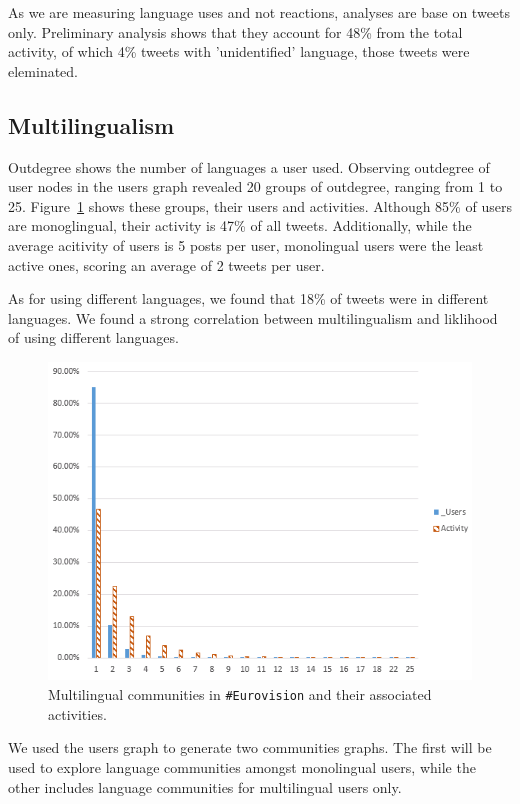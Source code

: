 \documentclass{llncs}
\begin{document}

As we are measuring language uses and not reactions, analyses are
base on tweets only. Preliminary analysis shows that they account 
for 48\% from the total activity, of which 4\% tweets with 'unidentified' language,
those tweets were eleminated.


\subsection{Multilingualism}
Outdegree shows the number of languages a user used. 
Observing outdegree of user nodes in the users graph revealed 
20 groups of outdegree, ranging from 1 to 25. Figure~\ref{fig:multilingual} 
shows these groups, their users and activities. Although 85\% of users are monoglingual,
their activity is 47\% of all tweets. Additionally, while the average acitivity of users is 5 posts
per user, monolingual users were the least active ones, scoring an average of 2 
tweets per user. 

As for using different languages, we found that 18\% of tweets were in different languages. 
We found a strong correlation between multilingualism
and liklihood of using different languages. 
\begin{figure}[htb]
\centering
\includegraphics[width=0.6\columnwidth]{images/multilingualcommunities.png}
\caption{Multilingual communities in {\texttt{\#Eurovision}} and their associated activities.}
\label{fig:multilingual}
\end{figure}

We used the users graph to generate two communities graphs. The first will
be used to explore language communities amongst monolingual users, while the other
includes language communities for multilingual users only.
\end{document}
